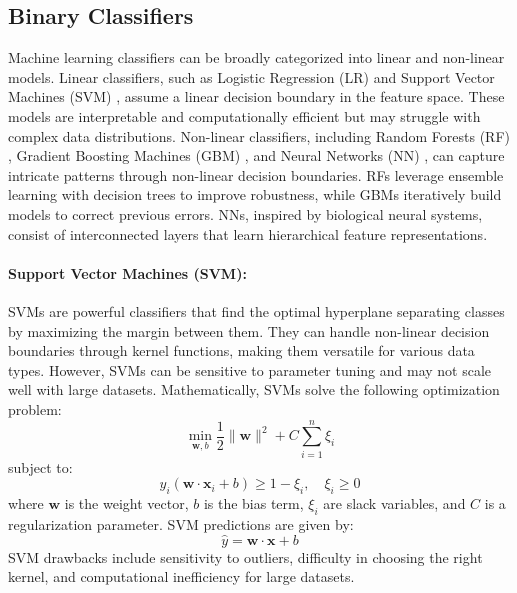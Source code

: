 \documentclass[12pt, a4paper]{article}
\begin{document}
\subsection{Binary Classifiers}
Machine learning classifiers can be broadly categorized into linear and non-linear models. Linear classifiers, such as Logistic Regression (LR) \cite{hosmer2013applied} and Support Vector Machines (SVM) \cite{cortes1995support}, assume a linear decision boundary in the feature space. These models are interpretable and computationally efficient but may struggle with complex data distributions. Non-linear classifiers, including Random Forests (RF) \cite{breiman2001random}, Gradient Boosting Machines (GBM) \cite{friedman2001greedy}, and Neural Networks (NN) \cite{goodfellow2016deep}, can capture intricate patterns through non-linear decision boundaries. RFs leverage ensemble learning with decision trees to improve robustness, while GBMs iteratively build models to correct previous errors. NNs, inspired by biological neural systems, consist of interconnected layers that learn hierarchical feature representations. 
\paragraph{Support Vector Machines (SVM)\cite{cortes1995support}:} SVMs are powerful classifiers that find the optimal hyperplane separating classes by maximizing the margin between them. They can handle non-linear decision boundaries through kernel functions, making them versatile for various data types. However, SVMs can be sensitive to parameter tuning and may not scale well with large datasets. Mathematically, SVMs solve the following optimization problem:
\begin{equation}
\min_{\mathbf{w}, b} \frac{1}{2} \|\mathbf{w}\|^2 + C \sum_{i=1}^{n} \xi_i
\end{equation}
subject to: 
\begin{equation}
y_i (\mathbf{w} \cdot \mathbf{x}_i + b) \geq 1 - \xi_i, \quad \xi_i \geq 0
\end{equation}
where $\mathbf{w}$ is the weight vector, $b$ is the bias term, $\xi_i$ are slack variables, and $C$ is a regularization parameter. SVM predictions are given by:
\begin{equation}
\hat{y} = \mathbf{w} \cdot \mathbf{x} + b
\end{equation}
SVM drawbacks include sensitivity to outliers, difficulty in choosing the right kernel, and computational inefficiency for large datasets. 
\end{document}
